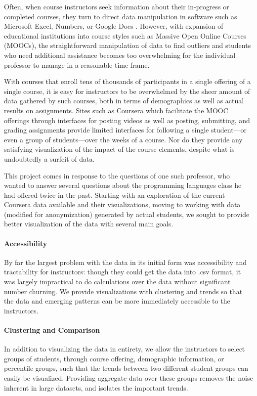 Often, when course instructors seek information about their in-progress or completed courses, they 
turn to direct data manipulation in software such as Microsoft Excel, Numbers, or Google Docs \cite{ excel, numbers, docs}. 
However, with expansion of educational institutions into course styles such as Massive Open Online 
Courses (MOOCs), the straightforward manipulation of data to find outliers and students who need 
additional assistance becomes too overwhelming for the individual professor to manage in a 
reasonable time frame. 

With courses that enroll tens of thousands of participants in a single offering of a single 
course, it is easy for instructors to be overwhelmed by the sheer amount of data gathered by such 
courses, both in terms of demographics as well as actual results on assignments. Sites such as 
Coursera \cite{ coursera} which facilitate the MOOC offerings through interfaces for posting videos as
well as posting, submitting, and grading assignments provide limited interfaces for following a single student---or even a group of students---over the weeks of a course. Nor do they provide any satisfying visualization of the impact of the course elements, despite what is undoubtedly a surfeit of data. 

This project comes in response to the questions of one such professor, who wanted to answer several questions about the programming languages class he had offered twice in the past. Starting with an exploration of the current Coursera data available and their visualizations, moving to working with data (modified for anonymization) generated by actual students, we sought to provide better visualization of the data with several main goals. 

\paragraph{Accessibility}
By far the largest problem with the data in its initial form was accessibility and tractability for 
instructors: though they could get the data into .csv format, it was largely impractical to do calculations
over the data without significant number churning. We provide visualizations with clustering and 
trends so that the data and emerging patterns can be more immediately accessible to the instructors.

\paragraph{Clustering and Comparison}
In addition to visualizing the data in entirety, we allow the instructors to select groups of students, 
through course offering, demographic information, or percentile groups, such that the trends between 
two different student groups can easily be visualized. Providing aggregate data over these groups removes the noise inherent in large datasets, and isolates the important trends. 

